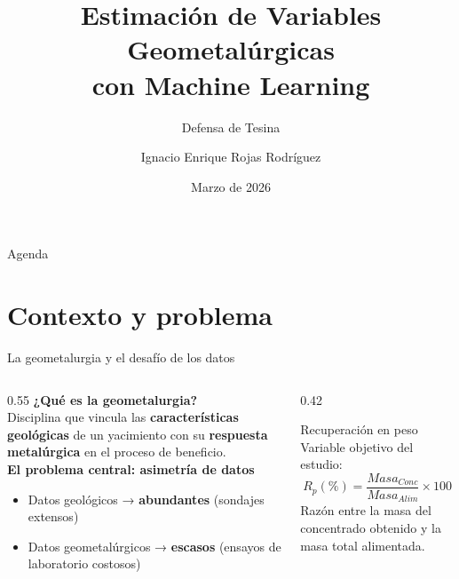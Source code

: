 \documentclass[10pt, aspectratio=169]{beamer}
\title{Estimación de Variables Geometalúrgicas\\con Machine Learning}
\subtitle{Defensa de Tesina}
\author{Ignacio Enrique Rojas Rodríguez}
\institute{%
	Magíster en Ciencia de Datos para la Innovación\\
	Universidad de Concepción\\[3pt]
	{\footnotesize\textcolor{mutedtext}{%
			Profesor guía: Pedro Pinacho \enspace|\enspace
			Profesor co-guía: José Ulloa}}
}
\date{Marzo de 2026}
\newcommand{\hl}[1]{\textcolor{accent}{\textbf{#1}}}
\newcommand{\emp}[1]{\textcolor{primary}{\textbf{#1}}}
\begin{document}
	
	\begin{frame}[plain]
		\titlepage
	\end{frame}
	
	\begin{frame}{Agenda}
		\tableofcontents
	\end{frame}
	
	\section{Contexto y problema}
	
	\begin{frame}{La geometalurgia y el desafío de los datos}
		\begin{columns}[T]
			\begin{column}{0.55\textwidth}
				\textbf{¿Qué es la geometalurgia?}\\[4pt]
				Disciplina que vincula las \hl{características geológicas} de un
				yacimiento con su \hl{respuesta metalúrgica} en el proceso de beneficio.\\[10pt]
				
				\textbf{El problema central: asimetría de datos}
				\begin{itemize}
					\item Datos geológicos → \emp{abundantes} (sondajes extensos)
					\item Datos geometalúrgicos → \emp{escasos} (ensayos de laboratorio costosos)
				\end{itemize}
			\end{column}
			\begin{column}{0.42\textwidth}
				\begin{block}{Recuperación en peso}
					Variable objetivo del estudio:\\[6pt]
					\[
					R_p(\%) = \frac{Masa_{Conc}}{Masa_{Alim}} \times 100
					\]
					{\small Razón entre la masa del concentrado
						obtenido y la masa total alimentada.}
				\end{block}
			\end{column}
		\end{columns}
	\end{frame}
	
\end{document}
